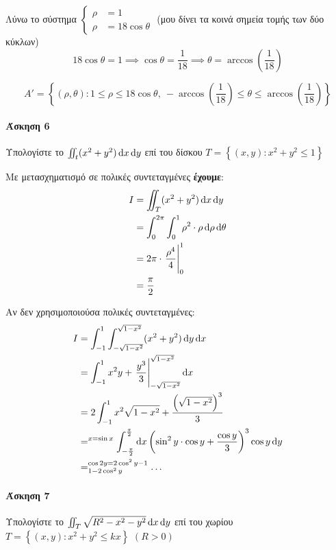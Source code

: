 \documentclass[11pt,a4paper,titlepage,draft]{article}
\begin{document}
\begin{enumparen}
Λύνω το σύστημα \(
\begin{cases}
\rho &=1 \\
\rho &= 18\cos\theta
\end{cases}
\) (μου δίνει τα κοινά σημεία τομής των δύο κύκλων)
\[
18\cos\theta=1\implies\cos\theta=\frac{1}{18}
\implies \theta = \arccos\left( \frac{1}{18}\right)
\]

\[
A' =  \left\lbrace
(\rho,\theta): 1 \leq \rho \leq 18\cos\theta,\
-\arccos\left( \frac{1}{18}\right) \leq \theta \leq \arccos\left( \frac{1}{18}\right)
 \right\rbrace
\]
\end{enumparen}

\paragraph{Άσκηση 6}
Υπολογίστε το \(\iint_t (x^2+y^2)\dif x \dif y\) επί του δίσκου \(T =  \left\lbrace (x,y): x^2+y^2 \leq 1  \right\rbrace\)

Με μετασχηματισμό σε πολικές συντεταγμένες \textbf{έχουμε}:
\begin{align*}
I &= \iint_T (x^2+y^2)\dif x \dif y \\ &=
\int_0^{2\pi} \int_0^1 \rho^2 \cdot \rho\dif\rho\dif\theta \\
&=
2\pi \cdot \left. \frac{\rho^4}{4} \right|_0^1 \\
&= \frac{\pi}{2}
\end{align*}

Αν δεν χρησιμοποιούσα πολικές συντεταγμένες:
\begin{align*}
I&=\int_{-1}^1 \int_{-\sqrt{1-x^2}}^{\sqrt{1-x^2}} (x^2+y^2) \dif y \dif x
\\ &=
\int_{-1}^1x^2y+\left. \frac{y^3}{3} \right|_{-\sqrt{1-x^2}}^{\sqrt{1-x^2}} \dif x
\\ &=
2 \int_{-1}^1 x^2\sqrt{1-x^2} + \frac{\left(\sqrt{1-x^2}\right)^3}{3}
\\ &=^{x=\sin x}
\int_{-\frac{\pi}{2}}^\frac{\pi}{2} \dif x
\left(
\sin^2 y \cdot \cos y + \frac{\cos y}{3}
\right)^3 \cos y \dif y
\\ &=^{\cos 2y = 2 \cos^2 y -1}_{1-2 \cos^2 y}  \dots
\end{align*}


\paragraph{Άσκηση 7}
Υπολογίστε το \(\iint_T \sqrt{R^2-x^2-y^2}\dif x \dif y\) επί του χωρίου
\(T =  \left\lbrace (x,y): x^2+y^2\leq kx \right\rbrace\) \( (R > 0 )\)
\end{document}
